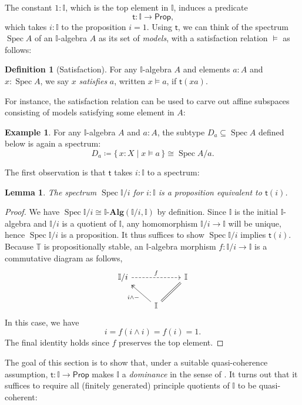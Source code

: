 \documentclass[a4paper,12pt]{amsart}
\newtheorem{lemma}[theorem]{Lemma}
\theoremstyle{definition}
\newtheorem{example}[theorem]{Example}
\newtheorem{definition}[theorem]{Definition}
\newcommand{\mb}[1]{\mathbf{#1}}
\newcommand{\mbb}[1]{\mathbb{#1}}
\newcommand{\T}{\mbb T}
\newcommand{\I}{\mbb I}
\newcommand{\ms}[1]{\mathsf{#1}}
\newcommand{\alg}{\text{-}\mb{Alg}}
\newcommand{\scomp}[2]{\{\,#1\mid#2\,\}}
\newcommand{\pp}{\ms{Prop}}
\newcommand{\spec}{\operatorname{Spec}}
\newcommand\istsym{\ms{t}}
\newcommand\ist[1]{\istsym(#1)}
\begin{document}
The constant $1 : \I$, which is the top element in $\I$, induces a predicate
\[ \istsym\colon \I \to \pp\text{,} \]
which takes $i : \I$ to the proposition $i = 1$. Using $\istsym$, we can think of the spectrum $\spec A$ of an $\I$-algebra $A$ as its set of \emph{models}, with a satisfaction relation $\models$ as follows:

\begin{definition}[Satisfaction]
  For any $\I$-algebra $A$ and elements $a:A$ and $x:\spec A$, we say $x$ \emph{satisfies} $a$, written $x \models a$, if $\ist{xa}$.
\end{definition}

For instance, the satisfaction relation can be used to carve out affine subspaces consisting of models satisfying some element in $A$:

\begin{example}
  For any $\I$-algebra $A$ and $a:A$, the subtype $D_a\subseteq \spec A$ defined below is again a spectrum:
  \[ D_a \coloneq \scomp{x : X}{x \models a} \cong \spec A/a\text{.} \]
\end{example}

The first observation is that $\istsym$ takes $i : \I$ to a spectrum:

\begin{lemma}\label{lem:openpropaffine}
  The spectrum $\spec\I/i$ for $i:\I$ is a proposition equivalent to $\ist{i}$.
\end{lemma}
\begin{proof}
  We have $\spec \I/i \cong \I\alg(\I/i,\I)$ by definition. Since $\I$ is the initial $\I$-algebra and $\I/i$ is a quotient of $\I$, any homomorphism $\I/i \to \I$ will be unique, hence $\spec\I/i$ is a proposition. It thus suffices to show $\spec\I/i$ implies $\ist{i}$. Because $\T$ is propositionally stable, an $\I$-algebra morphism $f \colon \I/i \to \I$ is a commutative diagram as follows,
  \[
  \begin{tikzcd}
    \I/i \ar[rr, dashed, "f"] & & \I \\ 
    & \I \ar[ul, two heads, "i \wedge -"] \ar[ur, equal]
  \end{tikzcd}
  \]
  In this case, we have
  \[ i = f(i \wedge i) = f(i) = 1\text{.} \]
  The final identity holds since $f$ preserves the top element. 
\end{proof}

The goal of this section is to show that, under a suitable quasi-coherence assumption, $\istsym\colon \I \to \pp$ makes $\I$ a \emph{dominance} in the sense of \citet{rosolini1986continuity}. It turns out that it suffices to require all (finitely generated) principle quotients of $\I$ to be quasi-coherent:
\end{document}
